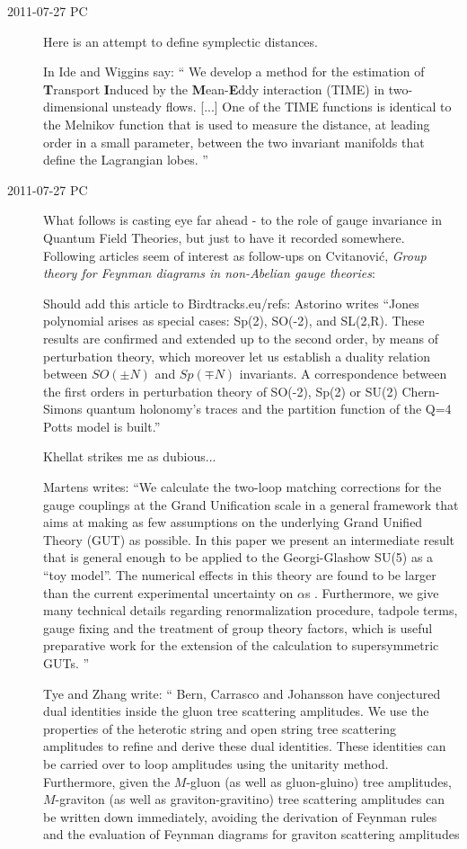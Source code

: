 \begin{description}
\item[2011-07-27 PC]
Here is an  attempt to define symplectic distances.

In 
Ide and Wiggins say:
``
We develop a method for the estimation of {\bf T}ransport {\bf
I}nduced by the {\bf M}ean-{\bf E}ddy interaction (TIME) in two-dimensional
unsteady flows.
[...]
One of the TIME functions is identical to the Melnikov function that is
used to measure the distance, at leading order in a small parameter,
between the two invariant manifolds that define the Lagrangian lobes.
''

\item[2011-07-27 PC]
What follows is casting eye far ahead - to the role of gauge invariance
in Quantum Field Theories, but just to have it recorded somewhere.
Following articles seem of interest as follow-ups on
Cvitanovi\'c, {\em Group theory for {Feynman} diagrams in
non-{Abelian} gauge theories}:

Should add this article to Birdtracks.eu/refs: Astorino
writes ``Jones polynomial arises as special cases: Sp(2), SO(-2), and
SL(2,R). These results are confirmed and extended up to the second order,
by means of perturbation theory, which moreover let us establish a
duality relation between $SO(\pm N)$ and $Sp(\mp N)$ invariants. A
correspondence between the first orders in perturbation theory of SO(-2),
Sp(2) or SU(2) Chern-Simons quantum holonomy's traces and the partition
function of the Q=4 Potts model is built.''

Khellat strikes me as dubious...

Martens writes: ``We calculate the two-loop matching corrections for the
   gauge couplings at the Grand Unification scale in a general framework
   that aims at making as few assumptions on the underlying Grand Unified
   Theory (GUT) as possible. In this paper we present an intermediate
   result that is general enough to be applied to the Georgi-Glashow
   SU(5) as a ``toy model''. The numerical effects in this theory are
   found to be larger than the current experimental uncertainty on $\alpha$s .
   Furthermore, we give many technical details regarding renormalization
   procedure, tadpole terms, gauge fixing and the treatment of group
   theory factors, which is useful preparative work for the extension of
   the calculation to supersymmetric GUTs.
   ''

Tye and Zhang write: ``
Bern, Carrasco and Johansson have conjectured dual
   identities inside the gluon tree scattering amplitudes.
   We use the properties of the heterotic string and open string tree
   scattering amplitudes to refine and derive these dual identities.
   These identities can be carried over to loop amplitudes using the
   unitarity method. Furthermore, given the $M$-gluon (as well as
   gluon-gluino) tree amplitudes, $M$-graviton (as well as
   graviton-gravitino) tree scattering amplitudes can be written down
   immediately, avoiding the derivation of Feynman rules and the
   evaluation of Feynman diagrams for graviton scattering amplitudes


\end{description}
